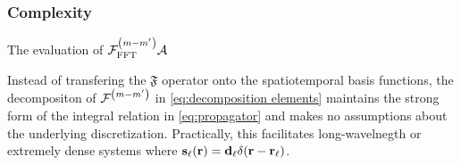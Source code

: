 \subsubsection{Complexity}

The evaluation of $\mathcal{F}_\text{FFT}^\qty(m-m') \mathcal{A}$

Instead of transfering the $\mathfrak{F}$ operator onto the spatiotemporal basis functions, the decompositon of $\mathcal{F}^\qty(m-m')$ in \cref{eq:decomposition elements} maintains the strong form of the integral relation in \cref{eq:propagator} and makes no assumptions about the underlying discretization.
Practically, this facilitates long-wavelnegth or extremely dense systems where $\vb{s}_\ell(\vb{r}) = \vb{d}_\ell \delta(\vb{r}-\vb{r}_\ell)$.


